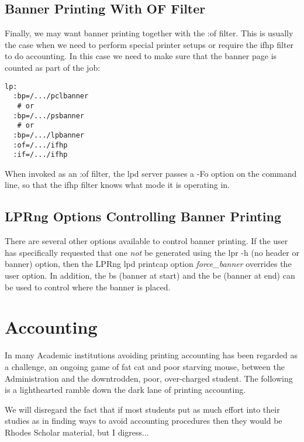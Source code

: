 \documentclass[a4paper]{article}
\begin{document}
\subsection{Banner Printing With OF Filter}

Finally,
we may want banner printing together with the {\ttfamily :of} filter.
This is usually the case when we need to perform special printer
setups or require the {\ttfamily ifhp} filter to do accounting.
In this case we need to make sure that the banner page is counted
as part of the job:
\begin{tscreen}
\begin{verbatim}
lp:
  :bp=/.../pclbanner
   # or
  :bp=/.../psbanner
   # or
  :bp=/.../lpbanner
  :of=/.../ifhp
  :if=/.../ifhp
\end{verbatim}
\end{tscreen}


When invoked as an {\ttfamily :of} filter, the {\ttfamily lpd}
server passes a {\ttfamily -Fo} option on the command line,
so that the {\ttfamily ifhp} filter knows what mode it is operating in.


\subsection{LPRng Options Controlling Banner Printing}

There are several other options available to control banner printing.
If the user has specifically requested that one
{\itshape not\/}
be generated using the {\ttfamily lpr -h} (no header or banner) option,
then the LPRng {\ttfamily lpd} printcap option {\itshape force\_banner\/}
overrides the user option.
In addition,
the {\ttfamily bs} (banner at start)
and
the {\ttfamily be} (banner at end)
can be used to control where the banner is placed.


\section{Accounting}

In many Academic institutions avoiding printing accounting has been
regarded as a challenge,  an ongoing game of fat cat and poor starving
mouse, between the Administration and the downtrodden, poor, over-charged
student.  The following is a lighthearted ramble down the dark lane of
printing accounting.

We will disregard the fact that if most students put as much effort
into their studies as in finding ways to avoid accounting procedures
then they would be Rhodes Scholar material,  but I digress...
\end{document}
